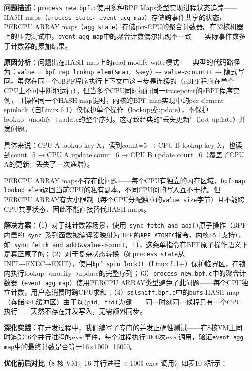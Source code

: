 \documentclass[a4paper]{ctexart}
\makeatletter
\renewcommand{\_}{%
  \ifmmode
    \nfss@text{\textunderscore}%
  \else
    \textunderscore\discretionary{}{}{}%
  \fi}
\makeatother
\begin{document}
\textbf{问题描述}：\texttt{process\_new.bpf.c}使用多种BPF Maps类型实现进程状态追踪——HASH maps（\texttt{process\_state}、\texttt{event\_agg\_map}）存储跨事件共享的状态，PERCPU\_ARRAY maps（\texttt{agg\_state}）存储per-CPU的聚合计数器。在32核机器上的压力测试中，\texttt{event\_agg\_map}中的聚合计数偶尔出现不一致——实际事件数多于计数器的累加结果。


\textbf{原因分析}：问题出在HASH map上的read-modify-write模式——典型的代码路径为：\texttt{value = bpf\_map\_lookup\_elem(\&map, \&key)} → \texttt{value->count++} → 隐式写回。虽然在同一个eBPF程序执行上下文中这三步是连续的（eBPF程序在单个CPU上不可中断地运行），但当多个CPU同时执行同一tracepoint的eBPF程序实例，且操作同一个HASH map键时，内核的BPF map实现中的per-element spinlock（自Linux 5.1）仅保护单个操作（lookup或update），不保护lookup→modify→update的整个序列。这导致经典的"丢失更新"（lost update）并发问题。


具体来说：CPU A lookup key X，读到count=5 → CPU B lookup key X，也读到count=5 → CPU A update count=6 → CPU B update count=6（覆盖了CPU A的更新，丢失了一次递增）。


PERCPU\_ARRAY maps不存在此问题——每个CPU有独立的内存区域，\texttt{bpf\_map\_lookup\_elem}返回当前CPU的私有副本，不同CPU间的写入互不干扰。但PERCPU\_ARRAY有大小限制（每个CPU分配独立的\texttt{value\_size}字节）且不能跨CPU共享状态，因此不能直接替代HASH maps。


\textbf{解决方案}：（1）对于纯计数器场景，使用\texttt{\_\_sync\_fetch\_and\_add()}原子操作（BPF内置的\texttt{\_\_sync\_*}系列函数被编译器映射为BPF的\texttt{BPF\_ATOMIC}指令，内核≥5.1支持），如\texttt{\_\_sync\_fetch\_and\_add(\&value->count, 1)}，这条单指令在BPF原子操作语义下是真正原子的；（2）对于复杂状态转换（如\texttt{process\_state}从INIT→EXEC→EXIT），使用\texttt{bpf\_spin\_lock()}（Linux 5.1+）保护临界区，在锁内执行lookup→modify→update的完整序列；（3）\texttt{process\_new.bpf.c}中的聚合计数器（\texttt{event\_agg\_map}）使用PERCPU\_ARRAY类型避免了此问题——每个CPU独立计数，用户态消费时跨CPU求和；（4）\texttt{sslsniff.bpf.c}中的\texttt{bufs} HASH map（存储SSL缓冲区）由于以\texttt{(pid, tid)}为键——同一时刻同一线程只有一个CPU执行——天然不存在并发写入，无需额外同步。


\textbf{深化实践}：在开发过程中，我们编写了专门的并发正确性测试——在8核VM上同时追踪16个并行进程的exec事件，每个进程执行1000次exec调用，验证\texttt{event\_agg\_map}中的最终计数是否等于16×1000=16000。


\textbf{优化前后对比}（8 核 VM，16 并行进程 × 1000 exec 调用）如表10-8所示：
\end{document}
